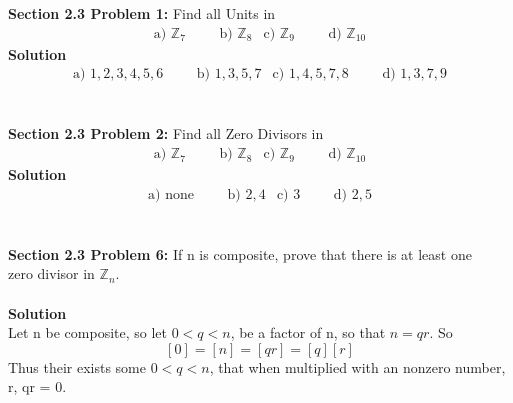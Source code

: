 \documentclass[12pt]{article}
\begin{document}
\newpage
\noindent \textbf{Section 2.3 Problem 1: } Find all Units in 
\begin{align*}
	\text{a) } \mathbb{Z}_7 &&& \text{b) } \mathbb{Z}_8 & \text{c) } \mathbb{Z}_9 &&& \text{d) } \mathbb{Z}_{10}
\end{align*}
\noindent \textbf{Solution }
\begin{align*}
	\text{a) } 1,2,3,4,5,6 &&& \text{b) } 1,3,5,7 & \text{c) } 1,4,5,7,8 &&& \text{d) } 1,3,7,9
\end{align*}
\\\\
\noindent \textbf{Section 2.3 Problem 2: } Find all Zero Divisors in 
\begin{align*}
\text{a) } \mathbb{Z}_7 &&& \text{b) } \mathbb{Z}_8 & \text{c) } \mathbb{Z}_9 &&& \text{d) } \mathbb{Z}_{10}
\end{align*}
\noindent \textbf{Solution }
\begin{align*}
\text{a) } \text{none} &&& \text{b) } 2,4 & \text{c) } 3 &&& \text{d) } 2,5
\end{align*}
\\\\
\noindent \textbf{Section 2.3 Problem 6: } If n is composite, prove that there is at least one \\zero divisor in $\mathbb{Z}_n$.
\\\\
\noindent \textbf{Solution }
\\
Let n be composite, so let $0 < q < n$, be a factor of n, so that $n = qr$. So 
$$[0] = [n] = [qr] = [q][r]$$
Thus their exists some $0 < q < n$, that when multiplied with an nonzero number, r, qr = 0.



	
\end{document}
